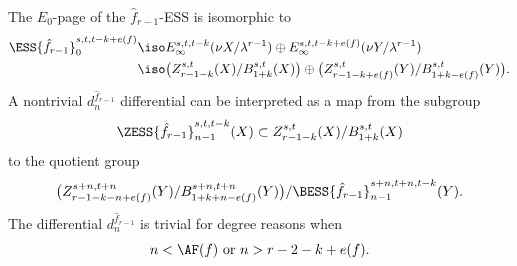 \begin{definition}
The $E_0$-page of the $\hat f_{r-1}$-ESS is isomorphic to
$$\begin{aligned}
    \ESS{\hat f_{r-1}}_0^{s,t,t-k+e(f)}\iso & E_\infty^{s,t,t-k}(\nu X/\lambda^{r-1})\oplus E_\infty^{s,t,t-k+e(f)}(\nu Y/\lambda^{r-1})\\
    \iso & \big(Z_{r-1-k}^{s,t}(X)/B_{1+k}^{s,t}(X)\big)\oplus \big(Z_{r-1-k+e(f)}^{s,t}(Y)/B_{1+k-e(f)}^{s,t}(Y)\big).
\end{aligned}$$
A nontrivial $d^{\hat f_{r-1}}_n$ differential can be interpreted as a map from the subgroup
\begin{equation}\label{eq:eae450fe}
  \ZESS{\hat f_{r-1}}_{n-1}^{s,t,t-k}(X) \subset  Z_{r-1-k}^{s,t}(X)/B_{1+k}^{s,t}(X)
\end{equation}
to the quotient group
\begin{equation}\label{eq:334248d2}
    \big(Z_{r-1-k-n+e(f)}^{s+n,t+n}(Y)/B_{1+k+n-e(f)}^{s+n,t+n}(Y) \big)/\BESS{\hat f_{r-1}}_{n-1}^{s+n,t+n,t-k}(Y).
\end{equation}
The differential $d^{\hat f_{r-1}}_n$ is trivial for degree reasons when
$$n<\AF(f)\text{ or }n>r-2-k+e(f).$$



\end{definition}

